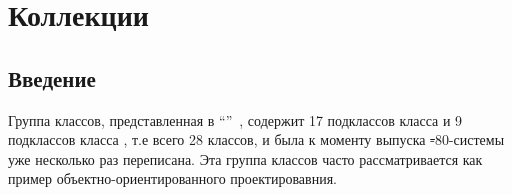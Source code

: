 \documentclass[a4paper,10pt,twoside]{book}
\begin{document}
	\sloppy
\fi
\chapter{Коллекции}


\section{Введение}

 Группа классов, представленная в ``''~\cite{Gold83a}, содержит 17 подклассов класса  и 9 подклассов класса , т.е всего 28 классов, и была к моменту выпуска \st-80-системы уже несколько раз переписана. Эта группа классов часто рассматривается как  пример объектно-ориентированного проектировавния.
\end{document}

